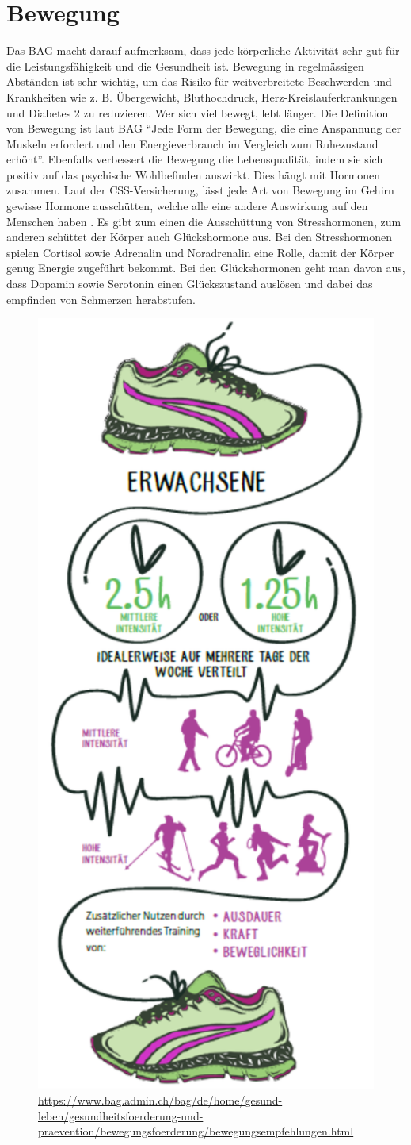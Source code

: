 \section{Bewegung}
\authortoc{\bastian}{\sectionident}
Das BAG macht darauf aufmerksam, dass jede körperliche Aktivität sehr gut für die Leistungsfähigkeit und die Gesundheit ist. Bewegung in regelmässigen Abständen ist sehr wichtig, um das Risiko für weitverbreitete Beschwerden und Krankheiten wie z. B. Übergewicht, Bluthochdruck, Herz-Kreislauferkrankungen und Diabetes 2 zu reduzieren.
\newline
Wer sich viel bewegt, lebt länger. Die Definition von Bewegung ist laut BAG “Jede Form der Bewegung, die eine Anspannung der Muskeln erfordert und den Energieverbrauch im Vergleich zum Ruhezustand erhöht”.
\newline
Ebenfalls verbessert die Bewegung die Lebensqualität, indem sie sich positiv auf das psychische Wohlbefinden auswirkt. Dies hängt mit Hormonen zusammen. Laut der CSS-Versicherung, lässt jede Art von Bewegung im Gehirn gewisse Hormone ausschütten, welche alle eine andere Auswirkung auf den Menschen haben \cite{hormone-bei-bewegung}. Es gibt zum einen die Ausschüttung von Stresshormonen, zum anderen schüttet der Körper auch Glückshormone aus. Bei den Stresshormonen spielen Cortisol sowie Adrenalin und Noradrenalin eine Rolle, damit der Körper genug Energie zugeführt bekommt. Bei den Glückshormonen geht man davon aus, dass Dopamin sowie Serotonin einen Glückszustand auslösen und dabei das empfinden von Schmerzen herabstufen.
\newline
\begin{figure}[!ht]
  \centering
  \includegraphics[width=0.38\linewidth]{./images/bewegungsempfehlungen-ew-dt.png}
  \caption{Grafik vom BAG zur Bewegungsempfehlung von Erwachsenen Menschen.}
  \label{fig:bewegungsempfehlungen}
  \caption*{\url{https://www.bag.admin.ch/bag/de/home/gesund-leben/gesundheitsfoerderung-und-praevention/bewegungsfoerderung/bewegungsempfehlungen.html}}
\end{figure}
